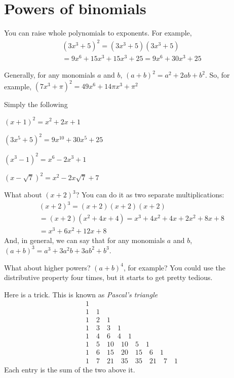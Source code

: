 \section{Powers of binomials}

You can raise whole polynomials to exponents. For example,
\begin{multline*}
  (3x^3 + 5)^2 = (3x^3 + 5)(3x^3 + 5) \\ = 9x^6 + 15x^3 + 15x^3 + 25 = 9x^6 + 30x^3 + 25 
\end{multline*}

Generally, for any monomials $a$ and $b$, $(a + b)^2 = a^2 + 2ab + b^2$.
So, for example, $(7x^3 + \pi)^2 = 49x^6 + 14\pi x^3 + \pi^2$

\begin{Exercise}[title={Powers of binomials}, label=binomialpower]
  Simply the following
  
\end{Exercise}
\begin{Answer}[ref=binomialpower]
  $(x+1)^2 = x^2 + 2x + 1$

  $(3x^5 + 5)^2 = 9x^10 + 30x^5 + 25$

  $(x^3 - 1)^2 = x^6 - 2x^3 + 1$

  $(x - \sqrt{7})^2 = x^2 - 2x\sqrt{7} + 7$
\end{Answer}

What about $(x + 2)^3$? You can do it as two separate multiplications:
\begin{multline*}
  (x+2)^3 = (x+2)(x+2)(x+2) \\
  = (x + 2)(x^2 + 4x + 4) = x^3 + 4x^2 + 4x + 2x^2 + 8x + 8 \\
  = x^3 + 6x^2 + 12x + 8
\end{multline*}
And, in general, we can say that for any monomials $a$ and $b$, $(a + b)^3 = a^3 + 3a^2b + 3ab^2 + b^3$.

What about higher powers? $(a + b)^4$, for example? You could use the
distributive property four times, but it starts to get pretty tedious.

Here is a trick. This is known as \emph{Pascal's triangle}
\begin{equation*}
\begin{array}{c}
 1 \\
 1 \quad 1 \\
 1 \quad 2 \quad 1 \\
 1 \quad 3 \quad 3 \quad 1 \\
 1 \quad 4 \quad 6 \quad 4 \quad 1 \\
 1 \quad 5 \quad 10 \quad 10 \quad 5 \quad 1 \\
 1 \quad 6 \quad 15 \quad 20 \quad 15 \quad 6 \quad 1 \\
 1 \quad 7 \quad 21 \quad 35 \quad 35 \quad 21 \quad 7 \quad 1
\end{array}
\end{equation*}
Each entry is the sum of the two above it.

